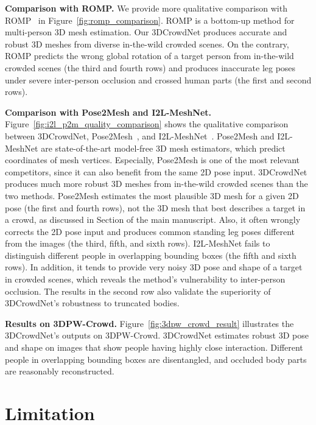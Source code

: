 \documentclass[10pt,twocolumn,letterpaper]{article}
\begin{document}
\noindent\textbf{Comparison with ROMP.}
We provide more qualitative comparison with ROMP~\cite{sun2021monocular} in Figure~\ref{fig:romp_comparison}.
ROMP is a bottom-up method for multi-person 3D mesh estimation.
Our 3DCrowdNet produces accurate and robust 3D meshes from diverse in-the-wild crowded scenes.
On the contrary, ROMP predicts the wrong global rotation of a target person from in-the-wild crowded scenes (the third and fourth rows) and produces inaccurate leg poses under severe inter-person occlusion and crossed human parts (the first and second rows).




\noindent\textbf{Comparison with Pose2Mesh and I2L-MeshNet.}
Figure~\ref{fig:i2l_p2m_quality_comparison} shows the qualitative comparison between 3DCrowdNet, Pose2Mesh~\cite{choi2020p2m}, and I2L-MeshNet~\cite{moon2020i2l}.
Pose2Mesh and I2L-MeshNet are state-of-the-art model-free 3D mesh estimators, which predict coordinates of mesh vertices.
Especially, Pose2Mesh is one of the most relevant competitors, since it can also benefit from the same 2D pose input.
3DCrowdNet produces much more robust 3D meshes from in-the-wild crowded scenes than the two methods.
Pose2Mesh estimates the most plausible 3D mesh for a given 2D pose (the first and fourth rows), not the 3D mesh that best describes a target in a crowd, as discussed in Section  of the main manuscript.
Also, it often wrongly corrects the 2D pose input and produces common standing leg poses different from the images (the third, fifth, and sixth rows).
I2L-MeshNet fails to distinguish different people in overlapping bounding boxes (the fifth and sixth rows).
In addition, it tends to provide very noisy 3D pose and shape of a target in crowded scenes, which reveals the method's vulnerability to inter-person occlusion.
The results in the second row also validate the superiority of 3DCrowdNet's robustness to truncated bodies.



\noindent\textbf{Results on 3DPW-Crowd.}
Figure~\ref{fig:3dpw_crowd_result} illustrates the 3DCrowdNet's outputs on 3DPW-Crowd.
3DCrowdNet estimates robust 3D pose and shape on images that show people having highly close interaction.
Different people in overlapping bounding boxes are disentangled, and occluded body parts are reasonably reconstructed.

 \section{Limitation}
\label{supp:limit}
\end{document}
